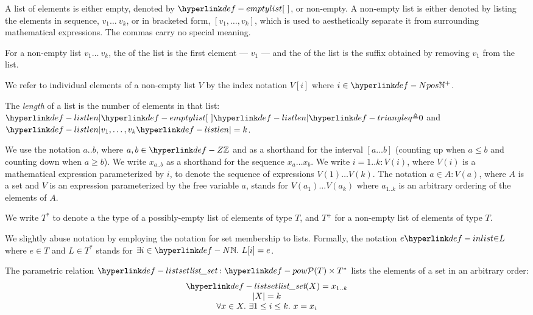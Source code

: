 A list of elements \hypertarget{def-emptylist}{is either empty, denoted by $\emptylist$}, or non-empty.
A non-empty list is either denoted by listing the elements in sequence, $v_1 \ldots\ v_k$,
or in bracketed form, $[v_1,\ldots,v_k]$, which is used to aesthetically separate it from surrounding mathematical expressions.
The commas carry no special meaning.

\hypertarget{def-head}{}
\hypertarget{def-tail}{}
For a non-empty list $v_1 \ldots\ v_k$, the \emph{\head} of the list is the first element --- $v_1$ ---
and the \emph{\tail} of the list is the suffix obtained by removing $v_1$ from the list.

We refer to individual elements of a non-empty list $V$ by the index notation $V[i]$ where $i\in\Npos$.

\hypertarget{def-listlen}{}
\begin{definition}
The \emph{length} of a list is the number of elements in that list:
$\listlen{\emptylist} \triangleq 0$ and $\listlen{v_1,\ldots,v_k}=k$.
\end{definition}

We use the notation $a..b$, where $a,b\in\Z$ and as a shorthand for the interval $[a\ldots b]$
(counting up when $a \leq b$ and counting down when $a \geq b$).
We write $x_{a..b}$ as a shorthand for the sequence $x_a \ldots x_b$.
%
We write $i=1..k: V(i)$, where $V(i)$ is a mathematical expression parameterized by $i$,
to denote the sequence of expressions $V(1) \ldots V(k)$.
The notation $a \in A: V(a)$, where $A$ is a set and $V$ is an expression parameterized by the free variable $a$,
stands for $V(a_1) \ldots V(a_k)$ where $a_{1..k}$ is an arbitrary ordering of the elements of $A$.

We write $T^*$ to denote a the type of a possibly-empty list of elements of type $T$,
and $T^+$ for a non-empty list of elements of type $T$.

\hypertarget{def-inlist}{}
We slightly abuse notation by employing the notation for set membership to lists.
Formally, the notation $e \inlist L$ where $e \in T$ and $L \in T^*$ stands for $\exists i\in\N.\ L[i]=e$.

\hypertarget{def-listset}{}
\begin{definition}
The parametric relation $\listset : \pow{T} \times T^*$
lists the elements of a set in an arbitrary order:
\[
\begin{array}{c}
  \listset(X) = x_{1..k}\\
  |X| = k\\
  \forall x\in X.\ \exists 1 \leq i \leq k.\ x = x_i
\end{array}
\]
\end{definition}


